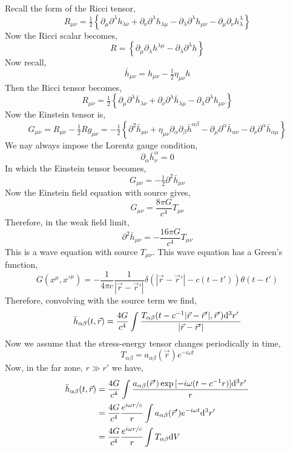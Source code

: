\documentclass[11pt, a4paper]{article}
\begin{document}
Recall the form of the Ricci tensor,
\[ R_{\mu \nu} = \tfrac{1}{2} \left\{ \partial_{\mu} \partial^\lambda h_{\lambda \nu} + \partial_\nu \partial^\lambda h_{\lambda \mu} - \partial_\lambda \partial^\lambda h_{\mu \nu} - \partial_{\mu} \partial_\nu h^\lambda_\lambda \right\} \]
Now the Ricci scalar becomes,
\[ R = \left\{ \partial_{\mu} \partial_\lambda h^{\lambda \mu} - \partial_\lambda \partial^\lambda h \right\} \]
Now recall,
\[ \bar{h}_{\mu \nu} = h_{\mu \nu} - \tfrac{1}{2} \eta_{\mu \nu} h \]
Then the Ricci tensor becomes,
\[ R_{\mu \nu} = \tfrac{1}{2} \left\{ \partial_{\mu} \partial^\lambda \bar{h}_{\lambda \nu} + \partial_\nu \partial^\lambda \bar{h}_{\lambda \mu} - \partial_\lambda \partial^\lambda h_{\mu \nu} \right\} \]
Now the Einstein tensor is,
\[ G_{\mu \nu} = R_{\mu \nu} - \tfrac{1}{2} R g_{\mu \nu} = - \tfrac{1}{2} \left\{ \partial^2 \bar{h}_{\mu \nu} + \eta_{\mu \nu} \partial_\alpha \partial_\beta \bar{h}^{\alpha \beta} - \partial_\mu \partial^\alpha \bar{h}_{\alpha \nu} - \partial_\nu \partial^\alpha \bar{h}_{\alpha \mu} \right\} \]
We nay always impose the Lorentz gauge condition,
\[ \partial_\alpha \bar{h}^\alpha_{\nu} = 0 \]
In which the Einstein tensor becomes,
\[ G_{\mu \nu} = -\tfrac{1}{2} \partial^2 \bar{h}_{\mu \nu} \]
Now the Einstein field equation with source gives,
\[ G_{\mu \nu} = \frac{8 \pi G}{c^4} T_{\mu \nu} \]
Therefore, in the weak field limit,
\[ \partial^2 \bar{h}_{\mu \nu} = - \frac{16 \pi G}{c^4} T_{\mu \nu} \]
This is a wave equation with source $T_{\mu \nu}$. This wave equation has a Green's function,
\[ G(x^\mu, x'^\mu) = - \frac{1}{4 \pi c} \frac{1}{|\vec{r} - \vec{r}'|} \delta(|\vec{r} - \vec{r}'| - c(t - t')) \theta(t - t') \]
Therefore, convolving with the source term we find,
\[ \bar{h}_{\alpha \beta}(t, \vec{r}) = \frac{4 G}{c^4} \int \frac{T_{\alpha \beta}(t - c^{-1} |\vec{r} - \vec{r}'|, \vec{r}') \mathrm{d}^{3} r' \:}{|\vec{r} - \vec{r}'|} \]
Now we assume that the stress-energy tensor changes periodically in time,
\[ T_{\alpha \beta} = a_{\alpha \beta}(\vec{r}) e^{- i \omega t} \]
Now, in the far zone, $r \gg r'$ we have,
\begin{align*}
\bar{h}_{\alpha \beta}(t, \vec{r}) & = \frac{4 G}{c^4} \int \frac{a_{\alpha \beta}(\vec{r}') \exp{[- i \omega (t - c^{-1} r)]} \mathrm{d}^{3} r' \:}{r}
\\
& = \frac{4 G}{c^4} \frac{e^{i \omega r / c}}{r} \int a_{\alpha \beta}(\vec{r}') e^{- i \omega t} \mathrm{d}^{3} r' \:
\\
& = \frac{4 G}{c^4} \frac{e^{i \omega r / c}}{r} \int T_{\alpha \beta} \mathrm{d}V \: 
\end{align*}
\end{document}
